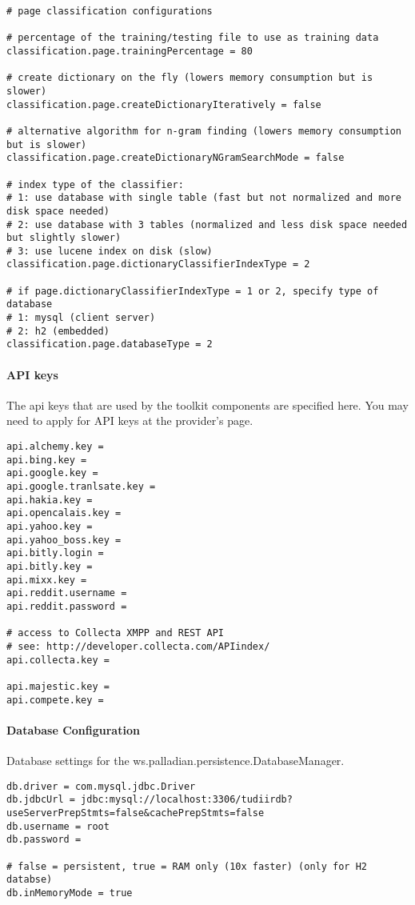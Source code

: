\begin{verbatim}
# page classification configurations

# percentage of the training/testing file to use as training data
classification.page.trainingPercentage = 80

# create dictionary on the fly (lowers memory consumption but is slower)
classification.page.createDictionaryIteratively = false

# alternative algorithm for n-gram finding (lowers memory consumption but is slower)
classification.page.createDictionaryNGramSearchMode = false

# index type of the classifier:
# 1: use database with single table (fast but not normalized and more disk space needed)
# 2: use database with 3 tables (normalized and less disk space needed but slightly slower)
# 3: use lucene index on disk (slow)
classification.page.dictionaryClassifierIndexType = 2

# if page.dictionaryClassifierIndexType = 1 or 2, specify type of database
# 1: mysql (client server)
# 2: h2 (embedded)
classification.page.databaseType = 2
\end{verbatim}

\paragraph{API keys}
\label{sec:apikeys.conf}
The api keys that are used by the toolkit components are specified here. You may need to apply for API keys at the provider's page.

\begin{verbatim}
api.alchemy.key = 
api.bing.key = 
api.google.key = 
api.google.tranlsate.key = 
api.hakia.key =
api.opencalais.key =
api.yahoo.key = 
api.yahoo_boss.key = 
api.bitly.login = 
api.bitly.key = 
api.mixx.key = 
api.reddit.username = 
api.reddit.password = 

# access to Collecta XMPP and REST API
# see: http://developer.collecta.com/APIindex/
api.collecta.key = 

api.majestic.key = 
api.compete.key = 
\end{verbatim}

\paragraph{Database Configuration}
Database settings for the ws.palladian.persistence.DatabaseManager.

\begin{verbatim}
db.driver = com.mysql.jdbc.Driver
db.jdbcUrl = jdbc:mysql://localhost:3306/tudiirdb?useServerPrepStmts=false&cachePrepStmts=false
db.username = root
db.password = 

# false = persistent, true = RAM only (10x faster) (only for H2 databse)
db.inMemoryMode = true 
\end{verbatim}

